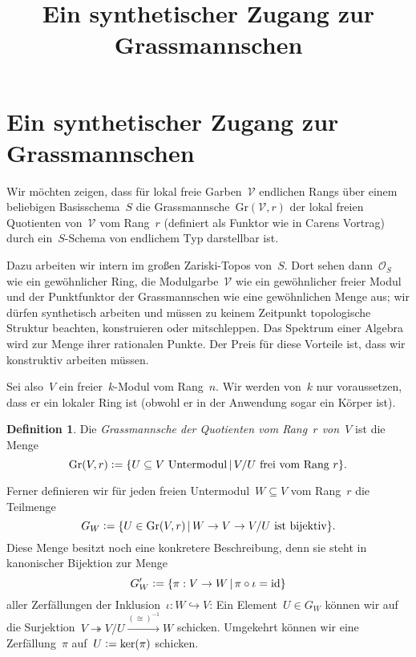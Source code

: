 \documentclass[a4paper,ngerman,12pt]{scrartcl}
\theoremstyle{definition}
\newtheorem{defn}{Definition}
\theoremstyle{plain}
\theoremstyle{remark}
\renewcommand{\O}{\mathcal{O}}
\newcommand{\id}{\mathrm{id}}
\newcommand{\defeq}{\vcentcolon=}
\newcommand{\Gr}{\mathrm{Gr}}
\begin{document}
\title{Ein synthetischer Zugang zur Grassmannschen}
\author{}

\section*{Ein synthetischer Zugang zur Grassmannschen}

Wir möchten zeigen, dass für lokal freie Garben~$\mathcal{V}$ endlichen Rangs
über einem beliebigen Basisschema~$S$ die Grassmannsche~$\Gr(\mathcal{V},r)$
der lokal freien Quotienten von~$\mathcal{V}$ vom Rang~$r$ (definiert als
Funktor wie in Carens Vortrag) durch ein~$S$-Schema von endlichem Typ
darstellbar ist.

Dazu arbeiten wir intern im großen Zariski-Topos von~$S$. Dort sehen
dann~$\O_S$ wie ein gewöhnlicher Ring, die Modulgarbe~$\mathcal{V}$ wie ein
gewöhnlicher freier Modul und der Punktfunktor der Grassmannschen wie eine
gewöhnlichen Menge aus; wir dürfen synthetisch arbeiten und müssen zu keinem
Zeitpunkt topologische Struktur beachten, konstruieren oder mitschleppen. Das
Spektrum einer Algebra wird zur Menge ihrer rationalen Punkte. Der Preis für
diese Vorteile ist, dass wir konstruktiv arbeiten müssen.

Sei also~$V$ ein freier~$k$-Modul vom Rang~$n$. Wir werden von~$k$
nur voraussetzen, dass er ein lokaler Ring ist (obwohl er in der Anwendung
sogar ein Körper ist).

\begin{defn}Die \emph{Grassmannsche der Quotienten vom Rang~$r$ von~$V$} ist
die Menge
\[ \Gr(V,r) \defeq \{ \text{$U \subseteq V$ Untermodul} \,|\, \text{$V/U$ frei
vom Rang~$r$} \}. \]
\end{defn}

Ferner definieren wir für jeden freien Untermodul~$W \subseteq V$ vom Rang~$r$
die Teilmenge
\[ G_W \defeq \{ U \in \Gr(V,r) \,|\, \text{$W \to V \to V/U$ ist bijektiv} \}. \]
Diese Menge besitzt noch eine konkretere Beschreibung, denn sie steht in
kanonischer Bijektion zur Menge
\[ G_W' \defeq \{ \pi : V \to W \,|\, \pi \circ \iota = \id \} \]
aller Zerfällungen der Inklusion~$\iota : W \hookrightarrow V$: Ein Element~$U
\in G_W$ können wir auf die Surjektion~$V \twoheadrightarrow V/U
\xrightarrow{({\cong})^{-1}} W$ schicken. Umgekehrt können wir eine
Zerfällung~$\pi$ auf~$U \defeq \ker(\pi)$ schicken.
\end{document}
